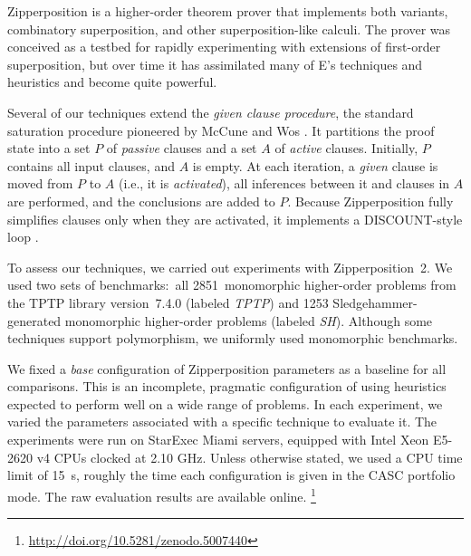 \documentclass[smallcondensed,draft]{svjour3}     %
\begin{document}
Zipperposition \cite{sc-15-simon-phd,bentkamp-et-al-2021-lamsup-journal} is a higher-order
theorem prover that implements both \lsup{} variants, combinatory
superposition, and other superposition-like calculi.
The prover was conceived as a testbed for rapidly
experimenting with extensions of first-order superposition, but over time it
has assimilated many of E's techniques and heuristics and become quite powerful.

Several of our techniques extend the \emph{given clause procedure}, the standard
saturation procedure pioneered by McCune and Wos \cite[Sect.~2.3]{mcw-1997-otter}. It partitions the proof
state into a set $P$ of \emph{passive} clauses and a set $A$ of \emph{active}
clauses. Initially, $P$ contains all input clauses, and $A$ is empty. At each
iteration, a \emph{given} clause is moved from $P$ to $A$ (i.e., it is
\emph{activated}), all inferences between it and clauses in $A$ are performed,
and the conclusions are added to $P$. Because Zipperposition fully simplifies
clauses only when they are activated, it implements a DISCOUNT-style loop
\cite{adf-1995-discount}.

To assess our techniques, we carried out experiments with Zipperposition~2. We
used two sets of benchmarks:\ all 2851~monomorphic higher-order problems from the
TPTP library \cite{gs-17-tptp} version~7.4.0 (labeled \emph{TPTP})
and 1253 Sledgehammer-generated
monomorphic higher-order problems (labeled \emph{SH}).
Although some techniques support polymorphism, we
uniformly used monomorphic benchmarks.

We fixed a \emph{base} configuration
of Zipperposition parameters as a baseline for all comparisons. This is an
incomplete, pragmatic configuration of \osup{} using heuristics expected to perform
well on a wide range of problems.
In each experiment, we varied
the parameters associated with a specific technique to evaluate it. The
experiments were run on StarExec Miami \cite{sst-14-starexec} servers, equipped with
Intel Xeon E5-2620 v4 CPUs clocked at 2.10 GHz. Unless otherwise stated, we used a
CPU time limit of 15~s, roughly the time each configuration is given in the
CASC portfolio mode. The raw evaluation results are available online.%
\footnote{\url{http://doi.org/10.5281/zenodo.5007440}}
\end{document}
